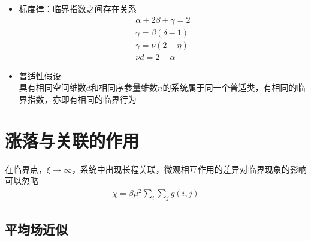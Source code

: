 \begin{itemize}
\begin{itemize}
\begin{gather*}
    \end{gather*}
    取长波长极限，$\tilde{g}(k)$发散，表明涨落关联对长波长很强烈
\end{itemize}
    \item 标度律：临界指数之间存在关系
\begin{gather*}
    \alpha + 2\beta + \gamma = 2
    \\
    \gamma = \beta (\delta - 1)
    \\
    \gamma = \nu (2 - \eta)
    \\
    \nu d = 2 - \alpha
\end{gather*}
    \item 普适性假设\\
    具有相同空间维数$d$和相同序参量维数$n$的系统属于同一个普适类，有相同的临界指数，亦即有相同的临界行为
\end{itemize}

\section{涨落与关联的作用}

在临界点，$\xi \to \infty$，系统中出现长程关联，微观相互作用的差异对临界现象的影响可以忽略
\begin{gather*}
    \chi = \beta \mu^2 \sum_i \sum_j g(i, j)
\end{gather*}

\subsection{平均场近似}

